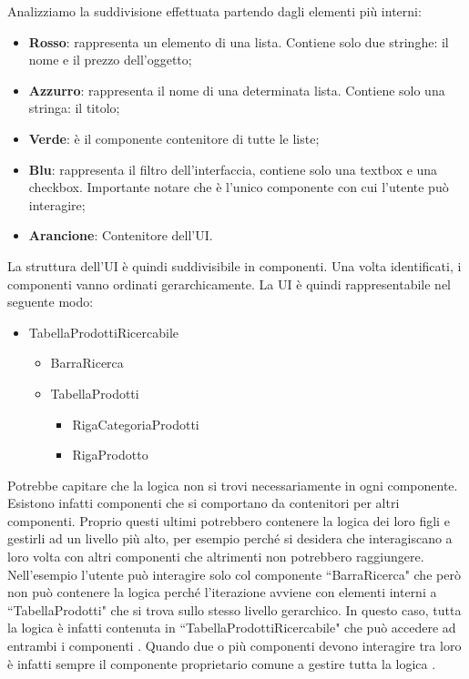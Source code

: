 Analizziamo la suddivisione effettuata partendo dagli elementi più interni:
\begin{itemize}
    \item \textbf{Rosso}: rappresenta un elemento di una lista. Contiene solo due stringhe: il nome e il prezzo dell'oggetto;
    \item  \textbf{Azzurro}: rappresenta il nome di una determinata lista. Contiene solo una stringa: il titolo;
    \item  \textbf{Verde}: è il componente contenitore di tutte le liste;
    \item \textbf{Blu}: rappresenta il filtro dell'interfaccia, contiene solo una textbox e una checkbox. Importante notare che è l'unico componente con cui l'utente può interagire;
    \item  \textbf{Arancione}: Contenitore dell'UI.
\end{itemize}
La struttura dell'UI è quindi suddivisibile in componenti.
Una volta identificati, i componenti vanno ordinati gerarchicamente. La UI è quindi rappresentabile nel seguente modo:
\renewcommand\labelitemii{$\bullet$}
\renewcommand\labelitemiii{$\bullet$}
\begin{itemize}
    \item TabellaProdottiRicercabile
    \begin{itemize}
        \item BarraRicerca
        \item TabellaProdotti
        \begin{itemize}
            \item RigaCategoriaProdotti
            \item RigaProdotto
        \end{itemize}
    \end{itemize}
\end{itemize}
\noindent Potrebbe capitare che la logica non si trovi necessariamente in ogni componente.
Esistono infatti componenti che si comportano da contenitori per altri componenti.
Proprio questi ultimi potrebbero contenere la logica dei loro figli e gestirli ad un livello più alto, per esempio perché si desidera che interagiscano a loro volta con altri componenti che altrimenti non potrebbero raggiungere.\newline
Nell'esempio l'utente può interagire solo col componente ``BarraRicerca" che però non può contenere la logica perché l'iterazione avviene con elementi interni a ``TabellaProdotti" che si trova sullo stesso livello gerarchico.\newline
In questo caso, tutta la logica è infatti contenuta in ``TabellaProdottiRicercabile" che può accedere ad entrambi i componenti \cite{thinkReact}.\newline
Quando due o più componenti devono interagire tra loro è infatti sempre il componente proprietario comune a gestire tutta la logica \cite{reactGetStart}.\newline


